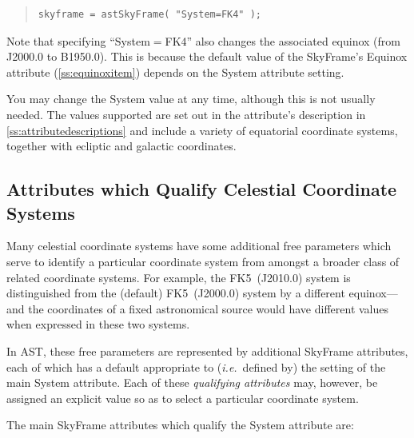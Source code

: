 \documentclass[twoside,11pt]{article}
\newcommand{\htmlref}[2]{#1}
\newcommand{\appref}[1]{Appendix~\ref{#1}}
\newcommand{\secref}[1]{\S\ref{#1}}
\renewcommand{\appref}[1]{\ref{#1}}
\renewcommand{\secref}[1]{\ref{#1}}
\begin{document}
\begin{quote}
\small
\begin{verbatim}
skyframe = astSkyFrame( "System=FK4" );
\end{verbatim}
\normalsize
\end{quote}

Note that specifying ``System$=$FK4'' also changes the associated
equinox (from J2000.0 to B1950.0). This is because the default value
of the SkyFrame's \htmlref{Equinox}{Equinox} attribute (\secref{ss:equinoxitem}) depends
on the System attribute setting.

You may change the System value at any time, although this is not
usually needed.  The values supported are set out in the attribute's
description in \appref{ss:attributedescriptions} and include a variety
of equatorial coordinate systems, together with ecliptic and galactic
coordinates.

\subsection{Attributes which Qualify Celestial Coordinate Systems}

Many celestial coordinate systems have some additional free parameters
which serve to identify a particular coordinate system from amongst a
broader class of related coordinate systems. For example, the
FK5~(J2010.0) system is distinguished from the (default) FK5~(J2000.0)
system by a different equinox---and the coordinates of a fixed
astronomical source would have different values when expressed in
these two systems.

In AST, these free parameters are represented by additional \htmlref{SkyFrame}{SkyFrame}
attributes, each of which has a default appropriate to
({\em{i.e.}}\ defined by) the setting of the main \htmlref{System}{System}
attribute. Each of these {\em{qualifying attributes}} may, however, be
assigned an explicit value so as to select a particular coordinate
system.

The main SkyFrame attributes which qualify the System attribute are:
\end{document}
